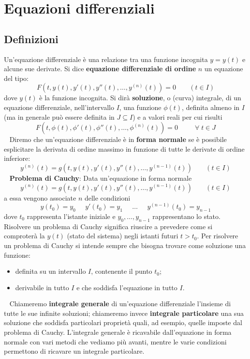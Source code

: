 \section{Equazioni differenziali}
\subsection{Definizioni}
Un'equazione differenziale è una relazione tra una funzione incognita $y=y(t)$ e alcune sue derivate.\newline
\newline
Si dice \textbf{equazione differenziale di ordine} $n$ un equazione del tipo:
\[
    F(t, y(t), y'(t), y''(t), \dots, y^{(n)}(t)) = 0 \;\;\;\;\;\;\;(t \in I)
\]
dove $y(t)$ è la funzione incognita.\newline
\newline
Si dirà \textbf{soluzione}, o (curva) integrale, di un equazione differenziale, nell'intervallo $I$, una funzione $\phi(t)$, definita almeno in $I$ (ma in generale può essere definita in $J \subseteq I$) e a valori reali per cui risulti
\[
    F(t, \phi(t), \phi'(t), \phi''(t), \dots, \phi^{(n)}(t))= 0 \;\;\;\;\;\;\;\; \;\forall\;t \in J
\]
\ \newline
\newline
Diremo che un'equazione differenziale è in \textbf{forma normale} se è possibile esplicitare la derivata di ordine massimo in funzione di tutte le derivate di ordine inferiore:
\[
    y^{(n)}(t) = g(t,y(t),y'(t),y''(t), \dots, y^{(n-1)}(t)) \;\;\;\;\;\;\;(t \in I)
\]
\ \newline
\newline
\textbf{Problema di Cauchy}:
Data un'equazione in forma normale
\[
    y^{(n)}(t) = g(t,y(t),y'(t),y''(t), \dots, y^{(n-1)}(t)) \;\;\;\;\;\;\;(t \in I)
\]
a essa vengono associate $n$ delle condizioni
\[
    y(t_0) = y_0 \;\;\;\;\; y'(t_0)=y_1 \;\;\;\;\;\dots \;\;\;\;\;y^{(n-1)}(t_0) = y_{n-1}
\]
dove $t_0$ rappresenta l'istante iniziale e $y_0,\dots,y_{n-1}$ rappresentano lo stato. Risolvere un problema di Cauchy significa riuscire a prevedere come si comproterà la $y(t)$ (stato del sistema) negli istanti futuri $t>t_0$. Per risolvere un problema di Cauchy si intende sempre che bisogna trovare come soluzione una funzione:
\begin{itemize}
    \item definita su un intervallo $I$, contenente il punto $t_0$;
    \item derivabile in tutto $I$ e che soddisfa l'equazione in tutto $I$.
\end{itemize}
\ \newline
Chiameremo \textbf{integrale generale} di un'equazione differenziale l'insieme di tutte le sue infinite soluzioni; chiameremo invece \textbf{integrale particolare} una sua soluzione che soddisfa particolari proprietà quali, ad esempio, quelle imposte dal problema di Cauchy.\newline
\newline
L'integrale generale è ricavabile dall'equazione in forma normale con vari metodi che vediamo più avanti, mentre le varie condizioni permettono di ricavare un integrale particolare.
